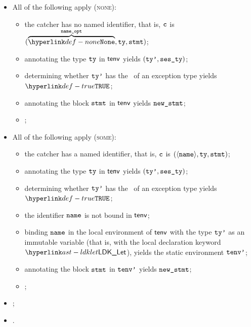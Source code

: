 \begin{itemize}
  \item All of the following apply (\textsc{none}):
  \begin{itemize}
    \item the catcher has no named identifier, that is, $\texttt{c}$ is $(\overname{\None}{\nameopt}, \tty, \vstmt)$;
    \item annotating the type $\texttt{ty}$ in $\textsf{tenv}$ yields $(\texttt{ty'}, \texttt{ses\_ty})$\ProseOrTypeError;
    \item determining whether $\texttt{ty'}$ has the \structure\ of an exception type yields \\ $\True$\ProseOrTypeError;
    \item annotating the block $\texttt{stmt}$ in $\textsf{tenv}$ yields $\texttt{new\_stmt}$;
    \item \Proseeqdef{$\newcatcher$}{$(\overname{\None}{\nameopt}, \ttyp, \newstmt)$};
  \end{itemize}

  \item All of the following apply (\textsc{some}):
  \begin{itemize}
    \item the catcher has a named identifier, that is, $\texttt{c}$ is $(\langle\texttt{name}\rangle, \texttt{ty}, \texttt{stmt})$;
    \item annotating the type $\texttt{ty}$ in $\textsf{tenv}$ yields $(\texttt{ty'}, \texttt{ses\_ty})$\ProseOrTypeError;
    \item determining whether $\texttt{ty'}$ has the \structure\ of an exception type yields \\ $\True$\ProseOrTypeError;
    \item the identifier $\texttt{name}$ is not bound in $\textsf{tenv}$;
    \item binding $\texttt{name}$ in the local environment of $\textsf{tenv}$ with the type $\texttt{ty'}$ as an immutable variable
          (that is, with the local declaration keyword $\LDKLet$), yields the static environment $\texttt{tenv'}$;
    \item annotating the block $\texttt{stmt}$ in $\texttt{tenv'}$ yields $\texttt{new\_stmt}$;
    \item \Proseeqdef{$\newcatcher$}{$(\overname{\langle\name\rangle}{\nameopt}, \ttyp, \newstmt)$};
  \end{itemize}
  \item {};
  \item {}.
\end{itemize}

